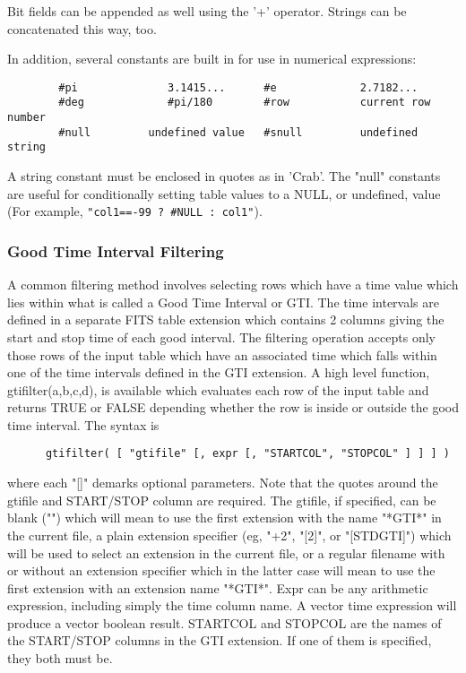 \documentclass[11pt]{article}
\begin{document}
Bit  fields can be appended as well using the '+' operator.  Strings
can be concatenated this way, too.

In addition, several constants are built in  for  use  in  numerical
expressions:

 
\begin{verbatim}
        #pi              3.1415...      #e             2.7182...
        #deg             #pi/180        #row           current row number
        #null         undefined value   #snull         undefined string
\end{verbatim}

A  string constant must  be enclosed  in quotes  as in  'Crab'.  The
"null" constants  are useful for conditionally  setting table values to
a NULL, or undefined, value (For example,  {\tt "col1==-99 ? \#NULL :
col1"}).

\subsubsection{Good Time Interval Filtering}

    A common filtering method involves selecting rows which have a time
    value which lies within what is called a Good Time Interval or GTI.
    The time intervals are defined in a separate FITS table extension
    which contains 2 columns giving the start and stop time of each
    good interval.  The filtering operation accepts only those rows of
    the input table which have an associated time which falls within
    one of the time intervals defined in the GTI extension. A high
    level function, gtifilter(a,b,c,d), is available which evaluates
    each row of the input table  and returns TRUE  or FALSE depending
    whether the row is inside or outside the  good time interval.  The
    syntax is
 
\begin{verbatim}
      gtifilter( [ "gtifile" [, expr [, "STARTCOL", "STOPCOL" ] ] ] )
\end{verbatim}
    where  each "[]" demarks optional parameters.  Note that  the quotes
    around the gtifile and START/STOP column are required.  The gtifile,
    if specified,  can be blank  ("") which will  mean to use  the first
    extension  with   the name "*GTI*"  in   the current  file,  a plain
    extension  specifier (eg, "+2",  "[2]", or "[STDGTI]") which will be
    used  to  select  an extension  in  the current  file, or  a regular
    filename with or without an extension  specifier which in the latter
    case  will mean to  use the first  extension  with an extension name
    "*GTI*".  Expr can be   any arithmetic expression, including  simply
    the time  column  name.  A  vector  time expression  will  produce a
    vector boolean  result.  STARTCOL and  STOPCOL are the  names of the
    START/STOP   columns in the    GTI extension.  If   one  of them  is
    specified, they both  must be.
\end{document}
